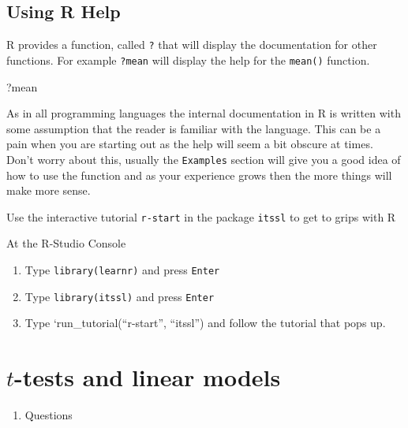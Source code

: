 \documentclass[
]{book}
\newenvironment{Shaded}{\begin{snugshade}}{\end{snugshade}}
\newcommand{\NormalTok}[1]{#1}
\providecommand{\tightlist}{%
  \setlength{\itemsep}{0pt}\setlength{\parskip}{0pt}}
\newenvironment{task}
{ \begin{tcolorbox}[title=For you to do,title filled] }
{  \end{tcolorbox} }
\begin{document}
\hypertarget{using-r-help}{%
\section{Using R Help}\label{using-r-help}}

R provides a function, called \texttt{?} that will display the documentation for other functions. For example \texttt{?mean} will display the help for the \texttt{mean()} function.

\begin{Shaded}
\begin{Highlighting}[]
\NormalTok{?mean}
\end{Highlighting}
\end{Shaded}

As in all programming languages the internal documentation in R is written with some assumption that the reader is familiar with the language. This can be a pain when you are starting out as the help will seem a bit obscure at times. Don't worry about this, usually the \texttt{Examples} section will give you a good idea of how to use the function and as your experience grows then the more things will make more sense.

\begin{task}
Use the interactive tutorial \texttt{r-start} in the package \texttt{itssl} to get to grips with R

At the R-Studio Console

\begin{enumerate}
\def\labelenumi{\arabic{enumi}.}
\tightlist
\item
  Type \texttt{library(learnr)} and press \texttt{Enter}
\item
  Type \texttt{library(itssl)} and press \texttt{Enter}
\item
  Type `run\_tutorial(``r-start'', ``itssl'') and follow the tutorial that pops up.
\end{enumerate}
\end{task}

\hypertarget{t-tests-and-linear-models}{%
\chapter{\texorpdfstring{\(t\)-tests and linear models}{t-tests and linear models}}\label{t-tests-and-linear-models}}

\begin{enumerate}
\def\labelenumi{\arabic{enumi}.}
\tightlist
\item
  Questions
\end{enumerate}
\end{document}
